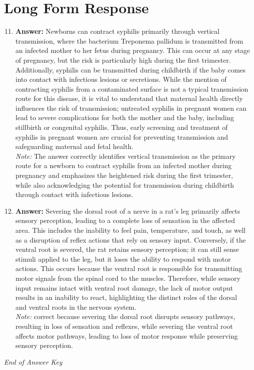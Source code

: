 \documentclass[12pt]{article}
\begin{document}
\section*{Long Form Response}
\begin{enumerate}[label=\arabic*.]
\setcounter{enumi}{10}
\item \textbf{Answer:} Newborns can contract syphilis primarily through vertical transmission, where the bacterium Treponema pallidum is transmitted from an infected mother to her fetus during pregnancy. This can occur at any stage of pregnancy, but the risk is particularly high during the first trimester. Additionally, syphilis can be transmitted during childbirth if the baby comes into contact with infectious lesions or secretions. While the mention of contracting syphilis from a contaminated surface is not a typical transmission route for this disease, it is vital to understand that maternal health directly influences the risk of transmission; untreated syphilis in pregnant women can lead to severe complications for both the mother and the baby, including stillbirth or congenital syphilis. Thus, early screening and treatment of syphilis in pregnant women are crucial for preventing transmission and safeguarding maternal and fetal health.
\\ \textit{Note:} The answer correctly identifies vertical transmission as the primary route for a newborn to contract syphilis from an infected mother during pregnancy and emphasizes the heightened risk during the first trimester, while also acknowledging the potential for transmission during childbirth through contact with infectious lesions.
\item \textbf{Answer:} Severing the dorsal root of a nerve in a rat's leg primarily affects sensory perception, leading to a complete loss of sensation in the affected area. This includes the inability to feel pain, temperature, and touch, as well as a disruption of reflex actions that rely on sensory input. Conversely, if the ventral root is severed, the rat retains sensory perception; it can still sense stimuli applied to the leg, but it loses the ability to respond with motor actions. This occurs because the ventral root is responsible for transmitting motor signals from the spinal cord to the muscles. Therefore, while sensory input remains intact with ventral root damage, the lack of motor output results in an inability to react, highlighting the distinct roles of the dorsal and ventral roots in the nervous system.
\\ \textit{Note:} correct because severing the dorsal root disrupts sensory pathways, resulting in loss of sensation and reflexes, while severing the ventral root affects motor pathways, leading to loss of motor response while preserving sensory perception.
\end{enumerate}

\vfill
\noindent\textit{End of Answer Key}
\end{document}
